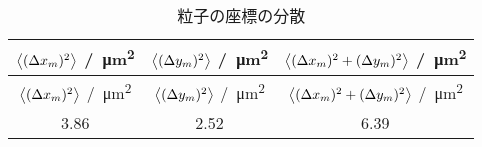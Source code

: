 \begin{longtable}{ccc}
    \caption{粒子の座標の分散} \label{tab:position-variance}                                                                                                                                     \\
    \hline $\left< (\Delta x_m)^2 \right>$ /\SI{}{\micro\meter\squared} & $\left< (\Delta y_m)^2 \right>$ /\SI{}{\micro\meter\squared} & $\left< (\Delta x_m)^2 + (\Delta y_m)^2 \right>$ /\SI{}{\micro\meter\squared} \\ \hline
    \endfirsthead
    \hline $\left< (\Delta x_m)^2 \right>$ /\SI{}{\micro\meter\squared} & $\left< (\Delta y_m)^2 \right>$ /\SI{}{\micro\meter\squared} & $\left< (\Delta x_m)^2 + (\Delta y_m)^2 \right>$ /\SI{}{\micro\meter\squared} \\ \hline
    \endhead
    \hline
    \endfoot

    3.86                                                      & 2.52                                               & 6.39                                                                \\
\end{longtable}
